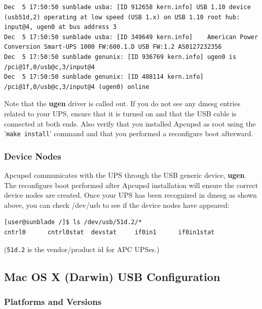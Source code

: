 \begin{verbatim}
Dec  5 17:50:50 sunblade usba: [ID 912658 kern.info] USB 1.10 device (usb51d,2) operating at low speed (USB 1.x) on USB 1.10 root hub: input@4, ugen0 at bus address 3
Dec  5 17:50:50 sunblade usba: [ID 349649 kern.info]    American Power Conversion Smart-UPS 1000 FW:600.1.D USB FW:1.2 AS0127232356
Dec  5 17:50:50 sunblade genunix: [ID 936769 kern.info] ugen0 is /pci@1f,0/usb@c,3/input@4
Dec  5 17:50:50 sunblade genunix: [ID 408114 kern.info] /pci@1f,0/usb@c,3/input@4 (ugen0) online
\end{verbatim}

Note that the {\bf ugen} driver is called out. If you do not see any dmesg entries
related to your UPS, ensure that it is turned on and that the USB cable is connected
at both ends. Also verify that you installed Apcupsd as root using the 
'\texttt{make install}' command and that you performed a reconfigure boot afterward.

\subsubsection*{Device Nodes}

Apcupsd communicates with the UPS through the USB generic device, {\bf ugen}.
The reconfigure boot performed after Apcupsd installation will ensure the
correct device nodes are created. Once your UPS has been recognized in dmesg
as shown above, you can check /dev/usb to see if the device nodes have appeared:

\begin{verbatim}
[user@sunblade /]$ ls /dev/usb/51d.2/*
cntrl0      cntrl0stat  devstat     if0in1      if0in1stat
\end{verbatim}

(\texttt{51d.2} is the vendor/product id for APC UPSes.)

\label{Darwin USB Configuration}
\subsection*{Mac OS X (Darwin) USB Configuration}

\subsubsection*{Platforms and Versions}


